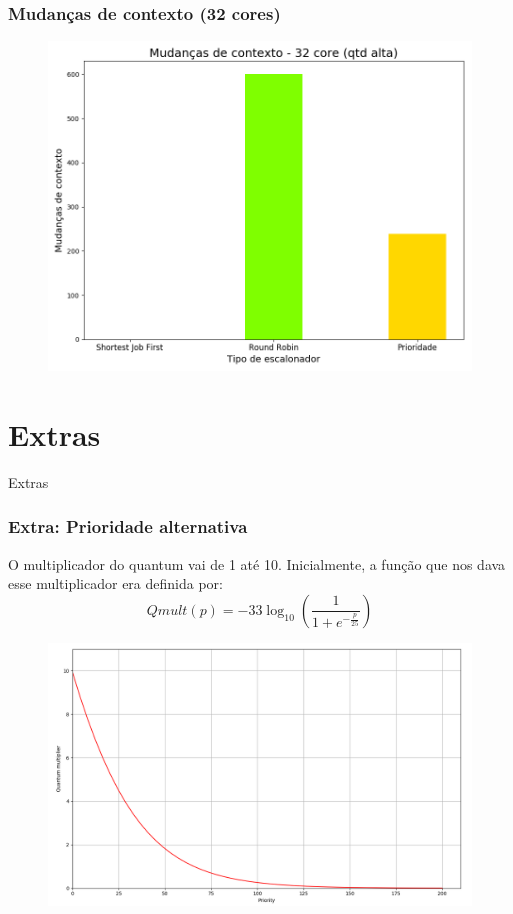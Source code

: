 \documentclass{beamer}
\begin{document}
\begin{frame}
\frametitle{Mudanças de contexto (32 cores)}
\begin{figure}
\includegraphics[scale=0.4]{ctx_long_32.png}
\end{figure}
\end{frame}

\section{Extras}

\begin{frame}
\begin{center}
\huge Extras
\end{center}
\end{frame}

\begin{frame}
\frametitle{Extra: Prioridade alternativa}
O multiplicador do quantum vai de 1 até 10. Inicialmente, a função que nos dava esse multiplicador era definida por:
$$Qmult(p) = -33\log_{10}\left(\frac{1}{1+e^{-\frac{p}{25}}}\right)$$
\begin{figure}
\includegraphics[scale=0.18]{sigmoidal.png}
\end{figure}
\end{frame}
\end{document}
